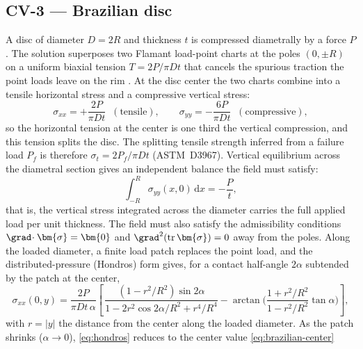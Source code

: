 \subsection{CV-3 --- Brazilian disc}\label{app:brazilian}

A disc of diameter $D=2R$ and thickness $t$ is compressed diametrally by a force $P$. The
solution superposes two Flamant load-point charts at the poles $(0,\pm R)$ on a uniform
biaxial tension $T=2P/\pi Dt$ that cancels the spurious traction the point loads leave on
the rim \citep{timoshenko1970elasticity}. At the disc center the two charts combine into a
tensile horizontal stress and a compressive vertical stress:
\begin{equation}\label{eq:brazilian-center}
  \sigma_{xx} = +\frac{2P}{\pi D t} \;\;(\text{tensile}),
  \qquad
  \sigma_{yy} = -\frac{6P}{\pi D t} \;\;(\text{compressive}),
\end{equation}
so the horizontal tension at the center is one third the vertical compression, and this
tension splits the disc. The splitting tensile strength inferred from a failure load $P_f$
is therefore $\sigma_t = 2P_f/\pi D t$ (ASTM~D3967). Vertical equilibrium across the
diametral section gives an independent balance the field must satisfy:
\begin{equation}\label{eq:brazilian-balance}
  \int_{-R}^{R}\sigma_{yy}(x,0)\,\mathrm{d}x = -\frac{P}{t},
\end{equation}
that is, the vertical stress integrated across the diameter carries the full applied load
per unit thickness. The field must also satisfy the admissibility conditions
$\grad\!\cdot\bm{\sigma}=\bm{0}$ and $\grad^2(\mathrm{tr}\,\bm{\sigma})=0$ away from the
poles. Along the loaded diameter, a finite load patch replaces the point load, and the
distributed-pressure (Hondros) form \citep{hondros1959evaluation} gives, for a contact
half-angle $2\alpha$ subtended by the patch at the center,
\begin{equation}\label{eq:hondros}
  \sigma_{xx}(0,y) = \frac{2P}{\pi D t\,\alpha}\!\left[\,
    \frac{(1-r^2/R^2)\sin 2\alpha}{1-2r^2\cos2\alpha/R^2+r^4/R^4}
    -\arctan\!\Big(\frac{1+r^2/R^2}{1-r^2/R^2}\tan\alpha\Big)\right],
\end{equation}
with $r=|y|$ the distance from the center along the loaded diameter. As the patch shrinks
($\alpha\to0$), \eqref{eq:hondros} reduces to the center value \eqref{eq:brazilian-center}

